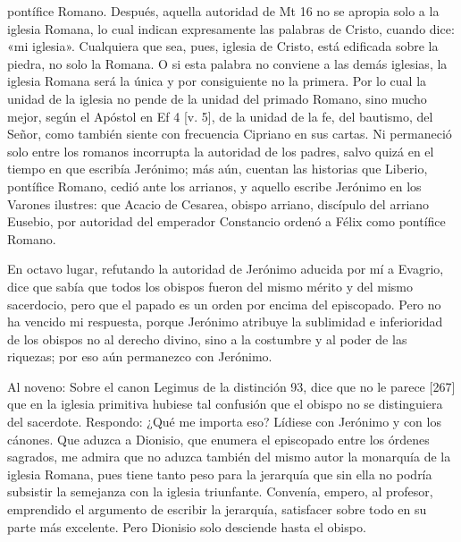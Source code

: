 pontífice Romano. Después, aquella autoridad de Mt 16 no se apropia solo a la iglesia Romana, lo cual indican expresamente las palabras de Cristo, cuando dice: «mi iglesia». Cualquiera que sea, pues, iglesia de Cristo, está edificada sobre la piedra, no solo la Romana. O si esta palabra no conviene a las demás iglesias, la iglesia Romana será la única y por consiguiente no la primera. Por lo cual la unidad de la iglesia no pende de la unidad del primado Romano, sino mucho mejor, según el Apóstol en Ef 4 [v. 5], de la unidad de la fe, del bautismo, del Señor, como también siente con frecuencia Cipriano en sus cartas. Ni permaneció solo entre los romanos incorrupta la autoridad de los padres, salvo quizá en el tiempo en que escribía Jerónimo; más aún, cuentan las historias que Liberio, pontífice Romano, cedió ante los arrianos, y aquello escribe Jerónimo en los Varones ilustres: que Acacio de Cesarea, obispo arriano, discípulo del arriano Eusebio, por autoridad del emperador Constancio ordenó a Félix como pontífice Romano.

En octavo lugar, refutando la autoridad de Jerónimo aducida por mí a Evagrio, dice que sabía que todos los obispos fueron del mismo mérito y del mismo sacerdocio, pero que el papado es un orden por encima del episcopado. Pero no ha vencido mi respuesta, porque Jerónimo atribuye la sublimidad e inferioridad de los obispos no al derecho divino, sino a la costumbre y al poder de las riquezas; por eso aún permanezco con Jerónimo.

Al noveno: Sobre el canon Legimus de la distinción 93, dice que no le parece [267] que en la iglesia primitiva hubiese tal confusión que el obispo no se distinguiera del sacerdote. Respondo: ¿Qué me importa eso? Lídiese con Jerónimo y con los cánones. Que aduzca a Dionisio, que enumera el episcopado entre los órdenes sagrados, me admira que no aduzca también del mismo autor la monarquía de la iglesia Romana, pues tiene tanto peso para la jerarquía que sin ella no podría subsistir la semejanza con la iglesia triunfante. Convenía, empero, al profesor, emprendido el argumento de escribir la jerarquía, satisfacer sobre todo en su parte más excelente. Pero Dionisio solo desciende hasta el obispo.

